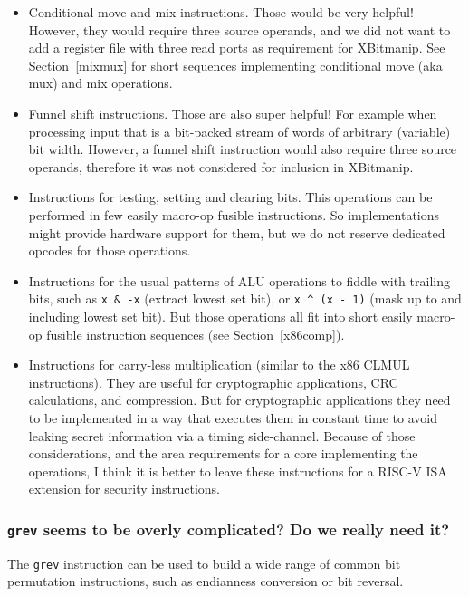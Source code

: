 \begin{itemize}
\item Conditional move and mix instructions. Those would be very helpful! However,
they would require three source operands, and we did not want to add a register
file with three read ports as requirement for XBitmanip. See Section~\ref{mixmux}
for short sequences implementing conditional move (aka mux) and mix operations.

\item Funnel shift instructions. Those are also super helpful! For example when
processing input that is a bit-packed stream of words of arbitrary (variable)
bit width. However, a funnel shift instruction would also require three source
operands, therefore it was not considered for inclusion in XBitmanip.

\item Instructions for testing, setting and clearing bits. This operations can
be performed in few easily macro-op fusible instructions. So implementations
might provide hardware support for them, but we do not reserve dedicated opcodes
for those operations.

\item Instructions for the usual patterns of ALU operations to fiddle with
trailing bits, such as {\tt x \& -x} (extract lowest set bit), or
{\tt x \^{} (x - 1)} (mask up to and including lowest set bit). But those
operations all fit into short easily macro-op fusible instruction sequences
(see Section~\ref{x86comp}).

\item Instructions for carry-less multiplication (similar to the x86 CLMUL
instructions). They are useful for cryptographic applications, CRC
calculations, and compression. But for cryptographic applications they need to
be implemented in a way that executes them in constant time to avoid leaking
secret information via a timing side-channel. Because of those considerations,
and the area requirements for a core implementing the operations, I think
it is better to leave these instructions for a RISC-V ISA extension for security
instructions.
\end{itemize}

\subsubsection{\texttt{grev} seems to be overly complicated? Do we really need it?}

The \texttt{grev} instruction can be used to build a wide range of common
bit permutation instructions, such as endianness conversion or bit reversal.

